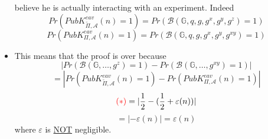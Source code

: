 \documentclass[../main]{subfiles}
\begin{document}
\begin{itemize}
              believe he is actually interacting with an experiment. Indeed
              $$Pr(PubK^{eav}_{\tilde{\Pi}, \mathcal{A}}(n) = 1) = Pr(\mathcal{B}(\mathbb{G}, q, g, g^x, g^y, g^z) = 1)$$
              $$Pr(PubK^{eav}_{\Pi, \mathcal{A}}(n) = 1) = Pr(\mathcal{B}(\mathbb{G}, q, g, g^x, g^y, g^{xy}) = 1)$$
        \item This means that the proof is over because
              $$|Pr(\mathcal{B}(\mathbb{G}, \ldots, g^z) = 1) - Pr(\mathcal{B}(\mathbb{G}, \ldots, g^{xy}) = 1)|$$
              $$ = |Pr(PubK^{eav}_{\tilde{\Pi}, \mathcal{A}} (n) = 1) - Pr(PubK^{eav}_{\Pi, \mathcal{A}} (n) = 1)|$$
              $$ \textcolor{red}{(*)} = | \frac{1}{2} - (\frac{1}{2} + \varepsilon (n))|$$
              $$ = |- \varepsilon (n)| = \varepsilon (n)$$
              where $\varepsilon$ is \underline{NOT} negligible.
    \end{itemize}
\end{document}
